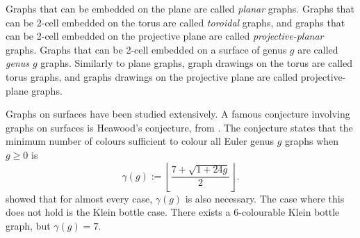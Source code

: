Graphs that can be embedded on the plane are called \textit{planar} graphs. Graphs that can be 2-cell embedded on the torus are called \textit{toroidal} graphs, and graphs that can be 2-cell embedded on the projective plane are called \textit{projective-planar} graphs. Graphs that can be 2-cell embedded on a surface of genus $g$ are called \textit{genus $g$} graphs. Similarly to plane graphs, graph drawings on the torus are called torus graphs, and graphs drawings on the projective plane are called projective-plane graphs. 


Graphs on surfaces have been studied extensively. A famous conjecture involving graphs on surfaces is Heawood's conjecture, from \textcite{heawoodMapcolourTheorem1890}. The conjecture states that the minimum number of colours sufficient to colour all Euler genus $g$ graphs when $g \geq 0$ is
	\begin{equation*}
		\gamma(g) := \left\lfloor 
		\frac{7 + \sqrt{1 + 24g}}{2}
		\right\rfloor.
	\end{equation*}
\textcite{ringelMapColorTheorem1974} showed that for almost every case, $\gamma(g)$ is also necessary. The case where this does not hold is the Klein bottle case. There exists a 6-colourable Klein bottle graph, but $\gamma(g) = 7$. 